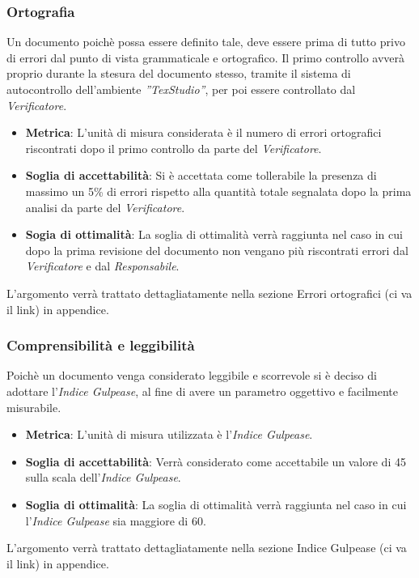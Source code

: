 \subsubsection{Ortografia}
Un documento poichè possa essere definito tale, deve essere prima di tutto privo di errori dal punto di vista grammaticale e ortografico. 
Il primo controllo avverà proprio durante la stesura del documento stesso, tramite il sistema di autocontrollo dell'ambiente  \emph{''TexStudio''}, per poi essere controllato dal  \emph{Verificatore}.
\begin{itemize}
	\item \textbf{Metrica}: L'unità di misura considerata è il numero di errori ortografici riscontrati dopo il primo controllo da parte del \emph{Verificatore}.
	\item \textbf{Soglia di accettabilità}: Si è accettata come tollerabile la presenza di massimo un 5\% di errori rispetto alla quantità totale segnalata dopo la prima analisi da parte del \emph{Verificatore}.
	\item \textbf{Sogia di ottimalità}: La soglia di ottimalità verrà raggiunta nel caso in cui dopo la prima revisione del documento non vengano più riscontrati errori dal \emph{Verificatore} e dal \emph{Responsabile}.
\end{itemize}
L'argomento verrà trattato dettagliatamente nella sezione Errori ortografici (ci va il link) in appendice.
\subsubsection{Comprensibilità e leggibilità}
Poichè un documento venga considerato leggibile e scorrevole si è deciso di adottare l'\emph{Indice Gulpease}, al fine di avere un parametro oggettivo e facilmente misurabile.
\begin{itemize}
	\item \textbf{Metrica}: L'unità di misura utilizzata è l'\emph{Indice Gulpease}.
	\item \textbf{Soglia di accettabilità}: Verrà considerato come accettabile un valore di 45 sulla scala dell'\emph{Indice Gulpease}.
	\item \textbf{Soglia di ottimalità}: La soglia di ottimalità verrà raggiunta nel caso in cui l'\emph{Indice Gulpease} sia maggiore di 60.
\end{itemize}
L'argomento verrà trattato dettagliatamente nella sezione Indice Gulpease (ci va il link) in appendice.

